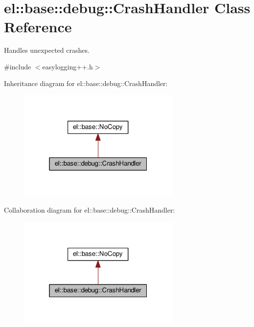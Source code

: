 \hypertarget{classel_1_1base_1_1debug_1_1_crash_handler}{}\section{el\+:\+:base\+:\+:debug\+:\+:Crash\+Handler Class Reference}
\label{classel_1_1base_1_1debug_1_1_crash_handler}


Handles unexpected crashes.  




{\ttfamily \#include $<$easylogging++.\+h$>$}



Inheritance diagram for el\+:\+:base\+:\+:debug\+:\+:Crash\+Handler\+:
\nopagebreak
\begin{figure}[H]
\begin{center}
\leavevmode
\includegraphics[width=229pt]{classel_1_1base_1_1debug_1_1_crash_handler__inherit__graph}
\end{center}
\end{figure}


Collaboration diagram for el\+:\+:base\+:\+:debug\+:\+:Crash\+Handler\+:
\nopagebreak
\begin{figure}[H]
\begin{center}
\leavevmode
\includegraphics[width=229pt]{classel_1_1base_1_1debug_1_1_crash_handler__coll__graph}
\end{center}
\end{figure}
